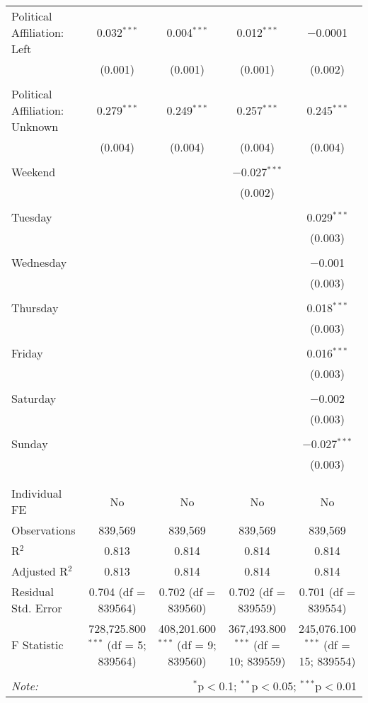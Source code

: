 \documentclass[
]{article}
\begin{document}
\begin{table}[!htbp]
{\begin{tabular}{@{\extracolsep{5pt}}lcccc}
 Political Affiliation: Left & 0.032$^{***}$ & 0.004$^{***}$ & 0.012$^{***}$ & $-$0.0001 \\ 
  & (0.001) & (0.001) & (0.001) & (0.002) \\ 
  & & & & \\ 
 Political Affiliation: Unknown & 0.279$^{***}$ & 0.249$^{***}$ & 0.257$^{***}$ & 0.245$^{***}$ \\ 
  & (0.004) & (0.004) & (0.004) & (0.004) \\ 
  & & & & \\ 
 Weekend &  &  & $-$0.027$^{***}$ &  \\ 
  &  &  & (0.002) &  \\ 
  & & & & \\ 
 Tuesday &  &  &  & 0.029$^{***}$ \\ 
  &  &  &  & (0.003) \\ 
  & & & & \\ 
 Wednesday &  &  &  & $-$0.001 \\ 
  &  &  &  & (0.003) \\ 
  & & & & \\ 
 Thursday &  &  &  & 0.018$^{***}$ \\ 
  &  &  &  & (0.003) \\ 
  & & & & \\ 
 Friday &  &  &  & 0.016$^{***}$ \\ 
  &  &  &  & (0.003) \\ 
  & & & & \\ 
 Saturday &  &  &  & $-$0.002 \\ 
  &  &  &  & (0.003) \\ 
  & & & & \\ 
 Sunday &  &  &  & $-$0.027$^{***}$ \\ 
  &  &  &  & (0.003) \\ 
  & & & & \\ 
\hline \\[-1.8ex] 
Individual FE & No & No & No & No \\ 
Observations & 839,569 & 839,569 & 839,569 & 839,569 \\ 
R$^{2}$ & 0.813 & 0.814 & 0.814 & 0.814 \\ 
Adjusted R$^{2}$ & 0.813 & 0.814 & 0.814 & 0.814 \\ 
Residual Std. Error & 0.704 (df = 839564) & 0.702 (df = 839560) & 0.702 (df = 839559) & 0.701 (df = 839554) \\ 
F Statistic & 728,725.800$^{***}$ (df = 5; 839564) & 408,201.600$^{***}$ (df = 9; 839560) & 367,493.800$^{***}$ (df = 10; 839559) & 245,076.100$^{***}$ (df = 15; 839554) \\ 
\hline 
\hline \\[-1.8ex] 
\textit{Note:}  & \multicolumn{4}{r}{$^{*}$p$<$0.1; $^{**}$p$<$0.05; $^{***}$p$<$0.01} \\ 
\end{tabular}
} 
\end{table} 
\newpage
\end{document}
